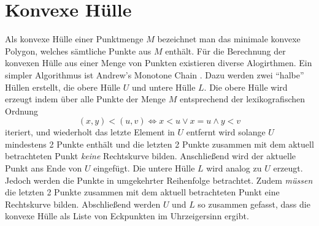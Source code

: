 \section*{Konvexe Hülle}

Als konvexe Hülle einer Punktmenge $M$ bezeichnet man das minimale konvexe
Polygon, welches sämtliche Punkte aus $M$ enthält.
Für die Berechnung der konvexen Hülle aus einer Menge von Punkten existieren
diverse Alogirthmen.
Ein simpler Algorithmus ist Andrew's Monotone Chain \cite{compgeom2008}.
Dazu werden zwei "`halbe"' Hüllen erstellt, die obere Hülle $U$ und untere Hülle
$L$.
Die obere Hülle wird erzeugt indem über alle Punkte der Menge $M$ entsprechend
der lexikografischen Ordnung
  \[ (x,y) < (u, v) \Longleftrightarrow x < u \vee x = u \wedge y < v \]
iteriert, und wiederholt das letzte Element in $U$ entfernt wird solange $U$
mindestens 2 Punkte enthält und die letzten 2 Punkte zusammen mit dem aktuell
betrachteten Punkt \emph{keine} Rechtskurve bilden.
Anschließend wird der aktuelle Punkt ans Ende von $U$ eingefügt.
Die untere Hülle $L$ wird analog zu $U$ erzeugt.
Jedoch werden die Punkte in umgekehrter Reihenfolge betrachtet.
Zudem \emph{müssen} die letzten 2 Punkte zusammen mit dem aktuell betrachteten
Punkt eine Rechtskurve bilden. Abschließend werden $U$ und $L$ so zusammen
gefasst, dass die konvexe Hülle als Liste von Eckpunkten im Uhrzeigersinn
ergibt.
